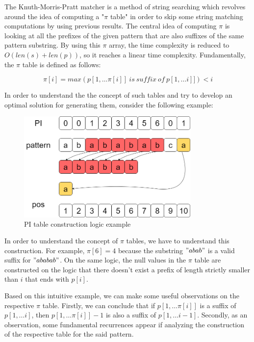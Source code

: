 \documentclass[letterpaper]{article}
\begin{document}
The Knuth-Morris-Pratt matcher is a method of string searching which revolves around the idea of computing a "$\pi$ table" in order to skip some string matching computations by using previous results. The central idea of computing $\pi$ is looking at all the prefixes of the given pattern that are also suffixes of the same pattern substring. By using this $\pi$ array, the time complexity is reduced to $O(len(s) + len(p))$, so it reaches a linear time complexity. Fundamentally, the $\pi$ table is defined as follows: 

$$
    \pi[i]=max(p[1,\dots \pi[i]] \ is \ suffix \ of \ p[1,\dots i]]) < i
$$

In order to understand the the concept of such tables and try to develop an optimal solution for generating them, consider the following example:


\begin{figure} [h!]
\centering
\includegraphics[width=0.8\textwidth]{pngOfDiagrams/KMPPI.png}
\caption{PI table construction logic example}
\end{figure}

In order to understand the concept of $\pi$ tables, we have to understand this construction. For example, $\pi[6] = 4$ because the substring $"abab"$ is a valid suffix for $"ababab"$. On the same logic, the null values in the $\pi$ table are constructed on the logic that there doesn't exist a prefix of length strictly smaller than $i$ that ends with $p[i]$.  

Based on this intuitive example, we can make some useful observations on the respective $\pi$ table. Firstly, we can conclude that if $p[1,\dots \pi[i]]$ is a suffix of $p[1,\dots i]$, then $p[1,\dots \pi[i]] - 1$ is also a suffix of $p[1,\dots i - 1]$. Secondly, as an observation, some fundamental recurrences appear if analyzing the construction of the respective table for the said pattern.
\end{document}
